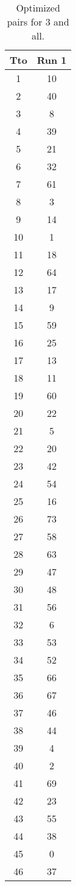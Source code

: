 \begin{table}
  \centering
  \scriptsize
  \caption{Optimized pairs for 3 and all.}
  \label{tab_pairs}
\begin{tabular}{c c }
\hline
Tto & Run 1 \\
\hline
1 & 10 \\
2 & 40 \\
3 & 8 \\
4 & 39 \\
5 & 21 \\
6 & 32 \\
7 & 61 \\
8 & 3 \\
9 & 14 \\
10 & 1 \\
11 & 18 \\
12 & 64 \\
13 & 17 \\
14 & 9 \\
15 & 59 \\
16 & 25 \\
17 & 13 \\
18 & 11 \\
19 & 60 \\
20 & 22 \\
21 & 5 \\
22 & 20 \\
23 & 42 \\
24 & 54 \\
25 & 16 \\
26 & 73 \\
27 & 58 \\
28 & 63 \\
29 & 47 \\
30 & 48 \\
31 & 56 \\
32 & 6 \\
33 & 53 \\
34 & 52 \\
35 & 66 \\
36 & 67 \\
37 & 46 \\
38 & 44 \\
39 & 4 \\
40 & 2 \\
41 & 69 \\
42 & 23 \\
43 & 55 \\
44 & 38 \\
45 & 0 \\
46 & 37 \\

\end{tabular}
\end{table}
